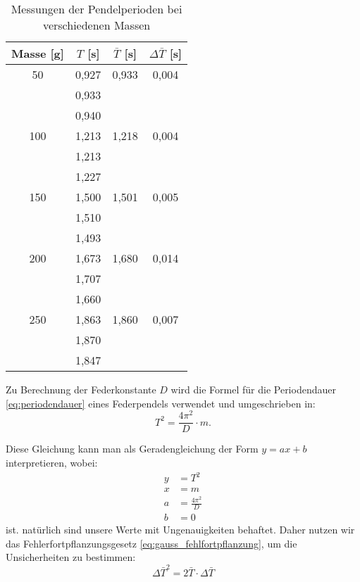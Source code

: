 \begin{table}[h!]
    \centering
    \begin{tabular}{c | c | c | c}
    Masse [g] & $T$ [s] & $\bar{T}$ [s] & $\Delta \bar{T}$ [s] \\
    \hline
    50  & 0,927 & 0,933 & 0,004 \\
        & 0,933 &       &       \\
        & 0,940 &       &       \\
    \hline
    100 & 1,213 & 1,218 & 0,004 \\
        & 1,213 &       &       \\
        & 1,227 &       &       \\
    \hline
    150 & 1,500 & 1,501 & 0,005 \\
        & 1,510 &       &       \\
        & 1,493 &       &       \\
    \hline
    200 & 1,673 & 1,680 & 0,014 \\
        & 1,707 &       &       \\
        & 1,660 &       &       \\
    \hline
    250 & 1,863 & 1,860 & 0,007 \\
        & 1,870 &       &       \\
        & 1,847 &       &       \\
    \hline
    \end{tabular}
    \caption{Messungen der Pendelperioden bei verschiedenen Massen}
    \label{tab:verschiedene_massen_messungen}
\end{table}

Zu Berechnung der Federkonstante $D$ wird die Formel für die Periodendauer \eqref{eq:periodendauer} eines Federpendels verwendet und umgeschrieben in:
\begin{equation}
    T^2 = \frac{4 \pi^2}{D} \cdot m.
    \label{eq:periodendauer_umgestellt}
\end{equation}

Diese Gleichung kann man als Geradengleichung der Form $y = ax + b$ interpretieren, wobei:
\begin{align}
    y &= T^2 \\
    x &= m \\
    a &= \frac{4 \pi^2}{D} \\
    b &= 0
\end{align}
ist. natürlich sind unsere Werte mit Ungenauigkeiten behaftet.
Daher nutzen wir das Fehlerfortpflanzungsgesetz \eqref{eq:gauss_fehlfortpflanzung}, um die Unsicherheiten zu bestimmen:
\begin{equation}
    \Delta \bar{T}^2 = 2 \bar{T} \cdot \Delta \bar{T}
\end{equation}


